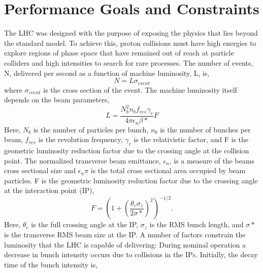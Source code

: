 \section{Performance Goals and Constraints}
The LHC was designed with the purpose of
exposing the physics that lies beyond the standard
model. To achieve this, proton collisions must 
have high energies to explore regions of phase space that 
have remained out of reach at particle colliders and high 
intensities to search for rare processes.
The number of events, N, delivered per second as a function
of machine luminosity, L, is,
\begin{equation}
N=L\sigma_{event}
\end{equation}
where $\sigma_{event}$ is the cross section of the event.
The machine luminosity itself depends on the beam parameters,
\begin{equation}
L=\frac{N_{b}^{2}n_{b}f_{rev}\gamma_{r}}{4\pi \epsilon_{n}\beta*}F
\end{equation}
Here, $N_{b}$ is the number of particles per bunch, $n_{b}$
is the number of bunches per beam, $f_{rev}$ is the
revolution frequency, $\gamma_{r}$ is the relativistic factor, 
and F is the geometric luminosity reduction factor due to the crossing
angle at the collision point. %
The normalized transverse beam emittance, $\epsilon_{n}$, is a measure of the
beams cross sectional size and $\epsilon_{n}\pi$ is the 
total cross sectional area occupied by beam particles. 
F is the geometric luminosity reduction factor due to the crossing angle
at the interaction point (IP),
\begin{equation}
F=\left(1+\left(\frac{\theta_{c}\sigma_{z}}{2\sigma*}\right)^{2}\right)^{-1/2}.
\end{equation}
Here, $\theta_{c}$ is the full crossing angle at the IP, $\sigma_{z}$ is the
RMS bunch length, and $\sigma*$ is the transverse RMS beam size
at the IP.
A number of factors constrain the luminosity that the LHC is capable
of delivering:%
During nominal operation a decrease in bunch intensity occurs
due to collisions in the IPs.
Initially, the decay time of the bunch intensity is,
